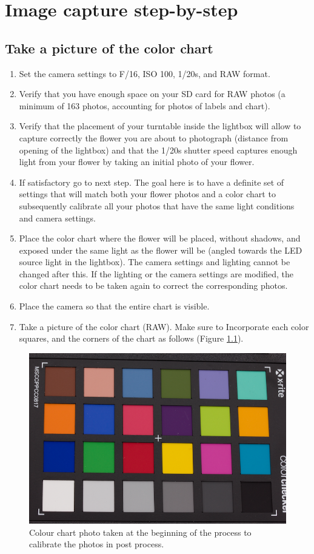 \documentclass[
]{book}
\begin{document}
\hypertarget{image-capture-step-by-step}{%
\chapter{Image capture step-by-step}\label{image-capture-step-by-step}}

\hypertarget{take-a-picture-of-the-color-chart}{%
\section{Take a picture of the color chart}\label{take-a-picture-of-the-color-chart}}

\begin{enumerate}
\def\labelenumi{\arabic{enumi}.}
\item
  Set the camera settings to F/16, ISO 100, 1/20s, and RAW format.
\item
  Verify that you have enough space on your SD card for RAW photos (a
  minimum of 163 photos, accounting for photos of labels and chart).
\item
  Verify that the placement of your turntable inside the lightbox will
  allow to capture correctly the flower you are about to photograph
  (distance from opening of the lightbox) and that the 1/20s shutter
  speed captures enough light from your flower by taking an initial
  photo of your flower.
\item
  If satisfactory go to next step. The goal here is to have a definite
  set of settings that will match both your flower photos and a color
  chart to subsequently calibrate all your photos that have the same
  light conditions and camera settings.
\item
  Place the color chart where the flower will be placed, without
  shadows, and exposed under the same light as the flower will be
  (angled towards the LED source light in the lightbox). The camera
  settings and lighting cannot be changed after this. If the lighting
  or the camera settings are modified, the color chart needs to be
  taken again to correct the corresponding photos.
\item
  Place the camera so that the entire chart is visible.
\item
  Take a picture of the color chart (RAW). Make sure to Incorporate
  each color squares, and the corners of the chart as follows (Figure
  \ref{fig:chart}).
\end{enumerate}

\begin{figure}

{\centering \includegraphics[width=0.4\linewidth]{Figures/chart_example} 

}

\caption{Colour chart photo taken at the beginning of the process to calibrate the photos in post process.}\label{fig:chart}
\end{figure}
\end{document}
